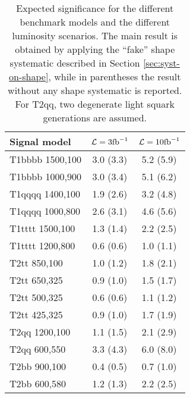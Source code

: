 \begin{table}
  \centering
  \caption{Expected significance for the different benchmark models and the different luminosity scenarios. 
    The main result is obtained by applying 
  the ``fake'' shape systematic described in Section \ref{sec:syst-on-shape},
while in parentheses the result without any shape systematic is reported. 
For T2qq, two degenerate light squark generations are assumed.}

  \label{tab:results_signif}
  \footnotesize
  \footnotesize
  \begin{tabular}{lcc}
    \hline
    \hline
    Signal model & $\mathcal{L} = 3 \text{fb}^{-1}$ & $\mathcal{L} = 10 \text{fb}^{-1}$ \\
    \hline
    \hline
    T1bbbb 1500,100  & 3.0 (3.3) & 5.2 (5.9) \\  
    T1bbbb 1000,900  & 3.0 (3.4) & 5.1 (6.2) \\  
    T1qqqq 1400,100  & 1.9 (2.6) & 3.2 (4.8) \\  
    T1qqqq 1000,800  & 2.6 (3.1) & 4.6 (5.6) \\  
    T1tttt 1500,100  & 1.3 (1.4) & 2.2 (2.5) \\  
    T1tttt 1200,800  & 0.6 (0.6) & 1.0 (1.1) \\  \hline
    T2tt 850,100     & 1.0 (1.2) & 1.8 (2.1) \\  
    T2tt 650,325     & 0.9 (1.0) & 1.5 (1.7) \\  
    T2tt 500,325     & 0.6 (0.6) & 1.1 (1.2) \\  
    T2tt 425,325     & 0.9 (1.0) & 1.7 (1.9) \\  
    T2qq 1200,100    & 1.1 (1.5) & 2.1 (2.9) \\  
    T2qq 600,550     & 3.3 (4.3) & 6.0 (8.0) \\  
    T2bb 900,100     & 0.4 (0.5) & 0.7 (1.0) \\  
    T2bb 600,580     & 1.2 (1.3) & 2.2 (2.5) \\  
    \hline
    \hline
  \end{tabular} 
\end{table}


